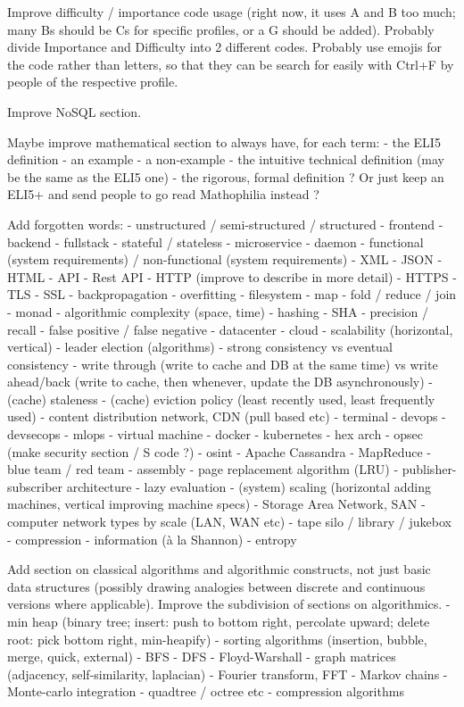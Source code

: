 \documentclass{article}
\begin{document}
Improve difficulty / importance code usage (right now, it uses A and B too much; many Bs should be Cs for specific profiles, or a G should be added). Probably divide Importance and Difficulty into 2 different codes. Probably use emojis for the code rather than letters, so that they can be search for easily with Ctrl+F by people of the respective profile.

Improve NoSQL section.

Maybe improve mathematical section to always have, for each term:
- the ELI5 definition
- an example
- a non-example
- the intuitive technical definition (may be the same as the ELI5 one)
- the rigorous, formal definition
? Or just keep an ELI5+ and send people to go read Mathophilia instead ?

Add forgotten words:
- unstructured / semi-structured / structured
- frontend
- backend
- fullstack
- stateful / stateless
- microservice
- daemon
- functional (system requirements) / non-functional (system requirements)
- XML
- JSON
- HTML
- API
- Rest API
- HTTP (improve to describe in more detail)
- HTTPS
- TLS
- SSL
- backpropagation
- overfitting
- filesystem
- map
- fold / reduce / join
- monad
- algorithmic complexity (space, time)
- hashing
- SHA
- precision / recall
- false positive / false negative
- datacenter
- cloud
- scalability (horizontal, vertical)
- leader election (algorithms)
- strong consistency vs eventual consistency
- write through (write to cache and DB at the same time) vs write ahead/back (write to cache, then whenever, update the DB asynchronously)
- (cache) staleness
- (cache) eviction policy (least recently used, least frequently used)
- content distribution network, CDN (pull based etc)
- terminal
- devops
- devsecops
- mlops
- virtual machine
- docker
- kubernetes
- hex arch
- opsec (make security section / S code ?) 
- osint
- Apache Cassandra
- MapReduce
- blue team / red team
- assembly
- page replacement algorithm (LRU)
- publisher-subscriber architecture
- lazy evaluation
- (system) scaling (horizontal adding machines, vertical improving machine specs)
- Storage Area Network, SAN
- computer network types by scale (LAN, WAN etc)
- tape silo / library / jukebox
- compression
- information (à la Shannon)
- entropy


Add section on classical algorithms and algorithmic constructs, not just basic data structures (possibly drawing analogies between discrete and continuous versions where applicable). Improve the subdivision of sections on algorithmics.
- min heap (binary tree; insert: push to bottom right, percolate upward; delete root: pick bottom right, min-heapify)
- sorting algorithms (insertion, bubble, merge, quick, external)
- BFS
- DFS
- Floyd-Warshall
- graph matrices (adjacency, self-similarity, laplacian)
- Fourier transform, FFT
- Markov chains
- Monte-carlo integration
- quadtree / octree etc
- compression algorithms
\end{document}

